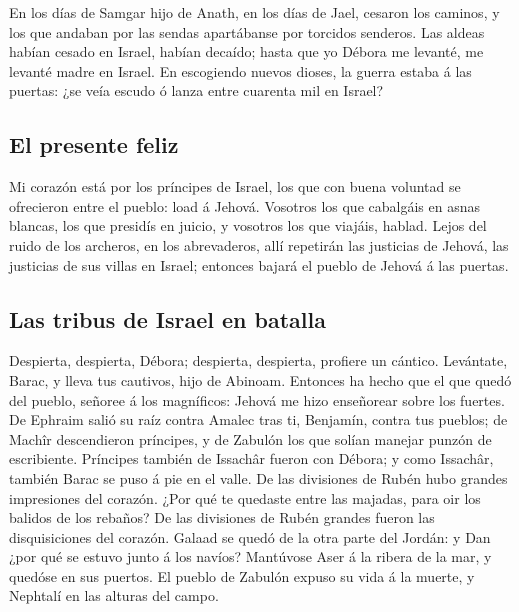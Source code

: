  En los días de Samgar hijo de Anath, en los días de Jael,
cesaron los caminos, y los que andaban por las sendas apartábanse por
torcidos senderos.  Las aldeas habían cesado en Israel,
habían decaído; hasta que yo Débora me levanté, me levanté madre en
Israel.  En escogiendo nuevos dioses, la guerra estaba á las
puertas: ¿se veía escudo ó lanza entre cuarenta mil en Israel?

\hypertarget{el-presente-feliz}{%
\subsection{El presente feliz}\label{el-presente-feliz}}

 Mi corazón está por los príncipes de Israel, los que con
buena voluntad se ofrecieron entre el pueblo: load á Jehová.
 Vosotros los que cabalgáis en asnas blancas, los que
presidís en juicio, y vosotros los que viajáis, hablad. 
Lejos del ruido de los archeros, en los abrevaderos, allí repetirán las
justicias de Jehová, las justicias de sus villas en Israel; entonces
bajará el pueblo de Jehová á las puertas.

\hypertarget{las-tribus-de-israel-en-batalla}{%
\subsection{Las tribus de Israel en
batalla}\label{las-tribus-de-israel-en-batalla}}

 Despierta, despierta, Débora; despierta, despierta,
profiere un cántico. Levántate, Barac, y lleva tus cautivos, hijo de
Abinoam.  Entonces ha hecho que el que quedó del pueblo,
señoree á los magníficos: Jehová me hizo enseñorear sobre los fuertes.
 De Ephraim salió su raíz contra Amalec tras ti, Benjamín,
contra tus pueblos; de Machîr descendieron príncipes, y de Zabulón los
que solían manejar punzón de escribiente.  Príncipes
también de Issachâr fueron con Débora; y como Issachâr, también Barac se
puso á pie en el valle. De las divisiones de Rubén hubo grandes
impresiones del corazón.  ¿Por qué te quedaste entre las
majadas, para oir los balidos de los rebaños? De las divisiones de Rubén
grandes fueron las disquisiciones del corazón.  Galaad se
quedó de la otra parte del Jordán: y Dan ¿por qué se estuvo junto á los
navíos? Mantúvose Aser á la ribera de la mar, y quedóse en sus puertos.
 El pueblo de Zabulón expuso su vida á la muerte, y
Nephtalí en las alturas del campo.

